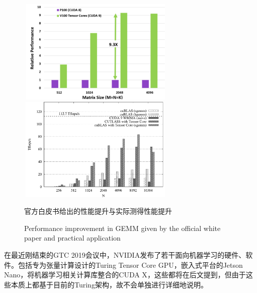 \begin{figure}
	\centering
	\includegraphics[width=7.5cm,height=5cm]{figures/VoltaGemmPerf.jpg}
	\includegraphics[width=7.5cm,height=5cm]{figures/ActualGemmPerf.jpg}
	\renewcommand{\thefigure}{\arabic{section}-\arabic{figure} }
	\renewcommand{\figurename}{图}
	\caption{官方白皮书给出的性能提升与实际测得性能提升\cite{VOLTAWHITEPAPER}\cite{TFCOMPARE}}
	\addtocounter{figure}{-1}
	\renewcommand{\thefigure}{\arabic{section}-\arabic{figure} }
	\renewcommand{\figurename}{Figure}
	\caption{Performance improvement in GEMM given by the official white paper and practical application\cite{VOLTAWHITEPAPER}\cite{TFCOMPARE}}
	\label{fig.PerfCompare}
\end{figure}
\par 在最近刚结束的GTC 2019会议中，NVIDIA发布了若干面向机器学习的硬件、软件。包括专为张量计算设计的Turing Tensor Core GPU，嵌入式平台的Jetson Nano\cite{JETSONNANO}，将机器学习相关计算库整合的CUDA X\cite{CUDAX}，这些都将在后文提到，但由于这些本质上都基于目前的Turing架构，故不会单独进行详细地说明。

